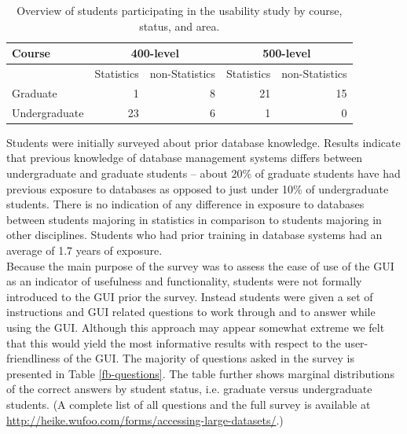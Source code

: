 \documentclass[11pt]{tise_style}
\begin{document}
\begin{table}[htbp]
   \centering
   \begin{tabular}{lrrrr} %
      \toprule
	Course  & \multicolumn{2}{c}{400-level} & \multicolumn{2}{c}{500-level} \\
      \midrule
      & Statistics & non-Statistics       & Statistics & non-Statistics \\
       \cmidrule(l){2-5}
      Graduate & 1 & 8 & 21 & 15 \\
      Undergraduate & 23 & 6 & 1 & 0 \\
      \bottomrule
   \end{tabular}
   \caption{Overview of students participating in the usability study by course, status, and area.}
   \label{fb-overview}
\end{table}

Students were initially surveyed about prior database knowledge. Results indicate that previous knowledge of database management systems differs between undergraduate and graduate students -- about 20\% of graduate students have had previous exposure to databases as opposed to just under 10\% of undergraduate students. There is no indication of any difference in exposure to databases between students majoring in statistics in comparison to students majoring in other disciplines. Students who had prior training in database systems had an average of 1.7 years of exposure. \\
Because the main purpose of the survey was to assess the ease of use of the GUI as an indicator of usefulness and functionality, students were not formally introduced to the GUI prior the survey. Instead students were given a set of instructions and GUI related questions to work through and to answer while using the GUI. Although this approach may appear somewhat extreme we felt that this would yield the most informative results with respect to the user-friendliness of the GUI.  The majority of questions asked in the survey is presented in Table \ref{fb-questions}. The table further shows marginal distributions of the correct answers by student status, i.e. graduate versus undergraduate students. (A complete list of all questions and the full survey is available at \url{http://heike.wufoo.com/forms/accessing-large-datasets/}.)
\end{document}
